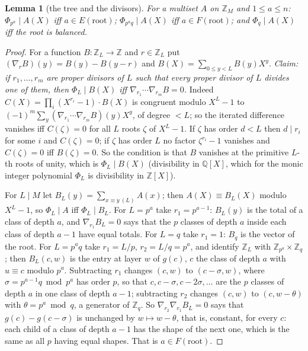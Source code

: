 \documentclass[11pt,a4paper]{amsart}
\newtheorem{lemma}[theorem]{Lemma}
\theoremstyle{definition}
\theoremstyle{remark}
\newcommand{\Z}{\mathbb{Z}}
\begin{document}
\begin{lemma}[the tree and the divisors]\label{lem:translate}
For a multiset $A$ on $\Z_M$ and $1\le a\le n$: $\Phi_{p^a}\mid A(X)$ iff $a\in E(\mathrm{root})$;
$\Phi_{p^aq}\mid A(X)$ iff $a\in F(\mathrm{root})$; and $\Phi_q\mid A(X)$ iff the root is balanced.
\end{lemma}

\begin{proof}
For a function $B\colon\Z_L\to\Z$ and $r\in\Z_L$ put $(\nabla_rB)(y)=B(y)-B(y-r)$ and
$B(X)=\sum_{0\le y<L}B(y)X^y$. \emph{Claim: if $r_1,\dots,r_m$ are proper divisors of $L$ such that every
proper divisor of $L$ divides one of them, then $\Phi_L\mid B(X)$ iff $\nabla_{r_1}\cdots\nabla_{r_m}B=0$.}
Indeed $C(X)=\prod_i(X^{r_i}-1)\cdot B(X)$ is congruent modulo $X^L-1$ to
$(-1)^m\sum_y(\nabla_{r_1}\cdots\nabla_{r_m}B)(y)X^y$, of degree $<L$; so the iterated difference vanishes iff
$C(\zeta)=0$ for all $L$ roots $\zeta$ of $X^L-1$. If $\zeta$ has order $d<L$ then $d\mid r_i$ for some $i$
and $C(\zeta)=0$; if $\zeta$ has order $L$ no factor $\zeta^{r_i}-1$ vanishes and $C(\zeta)=0$ iff
$B(\zeta)=0$. So the condition is that $B$ vanishes at the primitive $L$-th roots of unity, which is
$\Phi_L\mid B(X)$ (divisibility in $\mathbb{Q}[X]$, which for the monic integer polynomial $\Phi_L$ is divisibility in $\Z[X]$).

For $L\mid M$ let $B_L(y)=\sum_{x\equiv y\ (L)}A(x)$; then $A(X)\equiv B_L(X)$ modulo $X^L-1$, so
$\Phi_L\mid A$ iff $\Phi_L\mid B_L$. For $L=p^a$ take $r_1=p^{a-1}$: $B_L(y)$ is the total of a class of depth
$a$, and $\nabla_{r_1}B_L=0$ says that the $p$ classes of depth $a$ inside each class of depth $a-1$ have equal
totals. For $L=q$ take $r_1=1$: $B_q$ is the vector of the root. For $L=p^aq$ take $r_1=L/p$, $r_2=L/q=p^a$, and identify $\Z_L$ with $\Z_{p^a}\times\Z_q$; then
$B_L(c,w)$ is the entry at layer $w$ of $g(c)$, $c$ the class of depth $a$ with $u\equiv c$ modulo
$p^a$. Subtracting $r_1$ changes $(c,w)$ to $(c-\sigma,w)$, where $\sigma=p^{a-1}q\bmod p^a$ has order
$p$, so that $c,c-\sigma,c-2\sigma,\dots$ are the $p$ classes of depth $a$ in one class of depth $a-1$;
subtracting $r_2$ changes $(c,w)$ to $(c,w-\theta)$ with $\theta=p^a\bmod q$, a generator of $\Z_q$. So
$\nabla_{r_2}\nabla_{r_1}B_L=0$ says that $g(c)-g(c-\sigma)$ is unchanged by $w\mapsto w-\theta$, that
is, constant, for every $c$: each child of a class of depth $a-1$ has the shape of the next one, which
is the same as all $p$ having equal shapes. That is $a\in F(\mathrm{root})$.
\end{proof}
\end{document}
